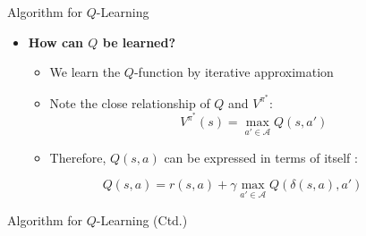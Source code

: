 \begin{frame}{Algorithm for $Q$-Learning}{}
	\begin{itemize}
		\item \textbf{How can $Q$ be learned?}
		\begin{itemize}
			\item We learn the $Q$-function by iterative approximation
			\item Note the close relationship of $Q$ and $V^{\pi^*}$:
			\begin{equation}
				V^{\pi^*}(s) = \max_{a' \in \mathcal{A}} Q(s, a')
			\end{equation}
			\item Therefore, $Q(s, a)$ can be expressed in terms of itself :
		\end{itemize}
	\end{itemize}
	
	\begin{boxBlueNoFrame}
		\begin{equation}
			Q(s, a) = r(s, a) + \gamma \max_{a' \in \mathcal{A}} Q(\delta(s, a), a')
		\end{equation}
	\end{boxBlueNoFrame}
\end{frame}


\begin{frame}{Algorithm for $Q$-Learning (Ctd.)}{}
\end{frame}


